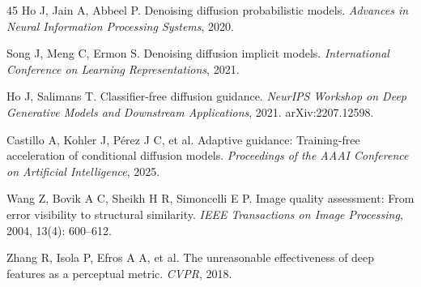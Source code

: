 \documentclass[times,twocolumn,final]{elsarticle}
\providecommand{\DIFadd}[1]{{\protect\color{blue} \sf #1}} %
\providecommand{\DIFaddbegin}{} %
\providecommand{\DIFaddend}{} %
\begin{document}
\begin{thebibliography}{45}
\DIFaddend {}
Ho J, Jain A, Abbeel P. Denoising diffusion probabilistic models. \textit{Advances in Neural Information Processing Systems}, 2020.

Song J, Meng C, Ermon S. Denoising diffusion implicit models. \textit{International Conference on Learning Representations}, 2021.

Ho J, Salimans T. Classifier-free diffusion guidance. \textit{NeurIPS Workshop on Deep Generative Models and Downstream Applications}, 2021. arXiv:2207.12598.

Castillo A, Kohler J, P\'erez J C, et al. Adaptive guidance: Training-free acceleration of conditional diffusion models. \textit{Proceedings of the AAAI Conference on Artificial Intelligence}, 2025.

 







Wang Z, Bovik A C, Sheikh H R, Simoncelli E P. Image quality assessment: From error visibility to structural similarity. \textit{IEEE Transactions on Image Processing}, 2004, 13(4): 600--612.

Zhang R, Isola P, Efros A A,   \DIFaddbegin \DIFadd{et al}\DIFaddend . The unreasonable effectiveness of deep features as a perceptual metric. \textit{  \DIFaddbegin \DIFadd{CVPR}\DIFaddend }, 2018.

 

 \end{thebibliography}
\DIFaddbegin \endgroup
 \DIFaddend
\end{document}
